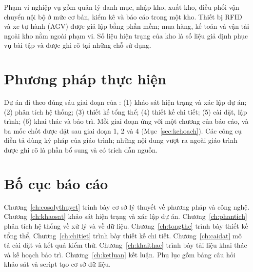Phạm vi nghiệp vụ gồm quản lý danh mục, nhập kho, xuất kho, điều phối vận chuyển nội bộ ở mức cơ bản, kiểm kê và báo cáo trong một kho. Thiết bị RFID và xe tự hành (AGV) được giả lập bằng phần mềm; mua hàng, kế toán và vận tải ngoài kho nằm ngoài phạm vi. Số liệu hiện trạng của kho là số liệu giả định phục vụ bài tập và được ghi rõ tại những chỗ sử dụng.

\section{Phương pháp thực hiện}

Dự án đi theo đúng sáu giai đoạn của \cite[Ch.~1]{tung_qlhttt}: (1) khảo sát hiện trạng và xác lập dự án; (2) phân tích hệ thống; (3) thiết kế tổng thể; (4) thiết kế chi tiết; (5) cài đặt, lập trình; (6) khai thác và bảo trì. Mỗi giai đoạn ứng với một chương của báo cáo, và ba mốc chốt được đặt sau giai đoạn 1, 2 và 4 (Mục~\ref{sec:kehoach}). Các công cụ diễn tả dùng ký pháp của giáo trình; những nội dung vượt ra ngoài giáo trình được ghi rõ là phần bổ sung và có trích dẫn nguồn.

\section{Bố cục báo cáo}

Chương~\ref{ch:cosolythuyet} trình bày cơ sở lý thuyết về phương pháp và công nghệ. Chương~\ref{ch:khaosat} khảo sát hiện trạng và xác lập dự án. Chương~\ref{ch:phantich} phân tích hệ thống về xử lý và về dữ liệu. Chương~\ref{ch:tongthe} trình bày thiết kế tổng thể, Chương~\ref{ch:chitiet} trình bày thiết kế chi tiết. Chương~\ref{ch:caidat} mô tả cài đặt và kết quả kiểm thử. Chương~\ref{ch:khaithac} trình bày tài liệu khai thác và kế hoạch bảo trì. Chương~\ref{ch:ketluan} kết luận. Phụ lục gồm bảng câu hỏi khảo sát và script tạo cơ sở dữ liệu.
